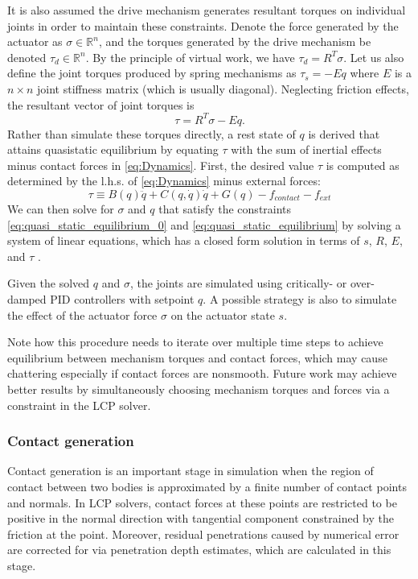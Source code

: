 It is also assumed the drive mechanism generates resultant torques on individual joints in order to maintain these constraints.  Denote the force generated by the actuator as $\sigma \in \mathbb{R}^n$, and the torques generated by the drive mechanism be denoted $\tau_{d} \in \mathbb{R}^n$. By the principle of virtual work, we have $\tau_{d} = R^T \sigma$.  Let us also define the joint torques produced by spring mechanisms as $\tau_{s} = - E q$ where $E$ is a $n \times n$ joint stiffness matrix (which is usually diagonal).  Neglecting friction effects, the resultant vector of joint torques is
\begin{equation}
\label{eq:quasi_static_equilibrium}
\tau = R^T\sigma - E q.
\end{equation}
Rather than simulate these torques directly, a rest state of $q$ is derived that attains quasistatic equilibrium by equating $\tau$ with the sum of inertial effects minus contact forces in \eqref{eq:Dynamics}. First, the desired value $\tau$ is computed as determined by the l.h.s. of \eqref{eq:Dynamics} minus external forces:
\begin{equation}
\tau \equiv B(q)\ddot{q} + C(q,\dot{q})\dot{q} + G(q) - f_{contact} - f_{ext}
\end{equation}
We can then solve for $\sigma$ and $q$ that satisfy the constraints \eqref{eq:quasi_static_equilibrium_0} and \eqref{eq:quasi_static_equilibrium} by solving a system of linear equations, which has a closed form solution in terms of $s$, $R$, $E$, and $\tau$ \cite{Grioli12}.

Given the solved $q$ and $\sigma$, the joints are simulated using critically- or over-damped PID controllers with setpoint $q$.  A possible strategy is also to simulate the effect of the actuator force $\sigma$ on the actuator state $s$.

Note how this procedure needs to iterate over multiple time steps to achieve equilibrium between mechanism torques and contact forces, which may cause chattering especially if contact forces are nonsmooth. Future work may achieve better results by simultaneously choosing mechanism torques and forces via a constraint in the LCP solver. 

\subsubsection{Contact generation}
Contact generation is an important stage in simulation when the region of contact between two bodies is approximated by a finite number of contact points and normals. In LCP solvers, contact forces at these points are restricted to be positive in the normal direction with tangential component constrained by the friction at the point. Moreover, residual penetrations caused by numerical error are corrected for via penetration depth estimates, which are calculated in this stage.


